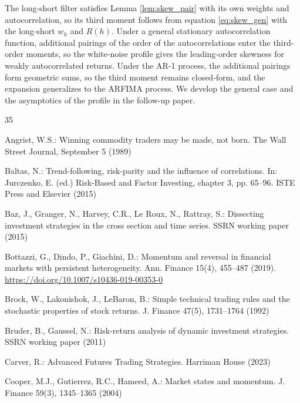 \documentclass[hidelinks]{siamonline250211}
\begin{document}
The long-short filter satisfies Lemma \ref{lem:skew_pair} with its own weights and autocorrelation, so its third moment follows from equation \eqref{eq:skew_gen} with the long-short $w_{h}$ and $R(h)$. Under a general stationary autocorrelation function, additional pairings of the order of the autocorrelations enter the third-order moments, so the white-noise profile gives the leading-order skewness for weakly autocorrelated returns. Under the AR-1 process, the additional pairings form geometric sums, so the third moment remains closed-form, and the expansion generalizes to the ARFIMA process. We develop the general case and the asymptotics of the profile in the follow-up paper.
\newpage
\begin{thebibliography}{35}
	
	 Angrist, W.S.: Winning commodity traders may be made, not born. The Wall Street Journal, September 5 (1989)
	
	 Baltas, N.: Trend-following, risk-parity and the influence of correlations. In: Jurczenko, E. (ed.) Risk-Based and Factor Investing, chapter 3, pp. 65--96. ISTE Press and Elsevier (2015)
	
	 Baz, J., Granger, N., Harvey, C.R., Le Roux, N., Rattray, S.: Dissecting investment strategies in the cross section and time series. SSRN working paper (2015)
	
	
	 Bottazzi, G., Dindo, P., Giachini, D.: Momentum and reversal in financial markets with persistent heterogeneity. Ann. Finance 15(4), 455--487 (2019). \url{https://doi.org/10.1007/s10436-019-00353-0}
	
	 Brock, W., Lakonishok, J., LeBaron, B.: Simple technical trading rules and the stochastic properties of stock returns. J. Finance 47(5), 1731--1764 (1992)
	
	 Bruder, B., Gaussel, N.: Risk-return analysis of dynamic investment strategies. SSRN working paper (2011)
	
	 Carver, R.: Advanced Futures Trading Strategies. Harriman House (2023)
	
	 Cooper, M.J., Gutierrez, R.C., Hameed, A.: Market states and momentum. J. Finance 59(3), 1345--1365 (2004)
	

\end{thebibliography}
\end{document}

